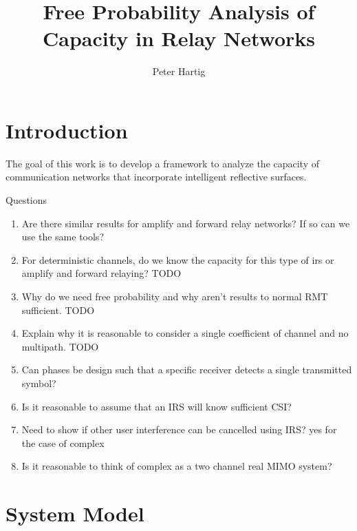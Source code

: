 \documentclass[12pt,a4paper]{report}
\title{Free Probability Analysis of Capacity in Relay Networks}
\author{Peter Hartig}
\begin{document}
\maketitle
\chapter{Introduction}
The goal of this work is to develop a framework to analyze the capacity of communication networks that incorporate intelligent reflective surfaces. 
\par
Questions
\begin{enumerate}
\item Are there similar results for amplify and forward relay networks? If so can we use the same tools?
\item For deterministic channels, do we know the capacity for this type of irs or amplify and forward relaying? TODO
\item Why do we need free probability and why aren't results to normal RMT sufficient. TODO
\item Explain why it is reasonable to consider a single coefficient of channel and no multipath. TODO
\item Can phases be design such that a specific receiver detects a single transmitted symbol?
\item Is it reasonable to assume that an IRS will know sufficient CSI?
\item Need to show if other user interference can be cancelled using IRS? yes for the case of complex 
\item Is it reasonable to think of complex as a two channel real MIMO system?
\end{enumerate}
\chapter{System Model}
\end{document}
